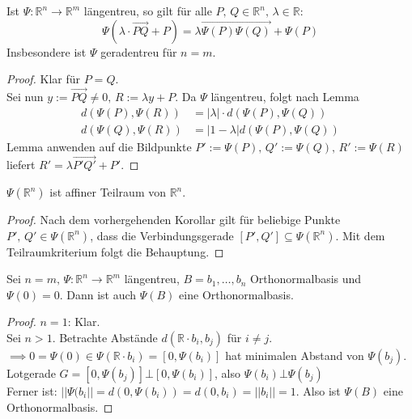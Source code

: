 \documentclass[parskip,a4paper,twoside,DIV15,BCOR12mm]{scrbook}
\begin{document}
\begin{corollary}
Ist \(\Psi:\mathbb{R}^{n}\to\mathbb{R}^{m}\) längentreu, so gilt für alle
\(P,\,Q\in\mathbb{R}^{n},\,\lambda\in\mathbb{R}\):
\[
\Psi(\lambda\cdot\overrightarrow{PQ}+P)=\lambda\overrightarrow{\Psi(P)\Psi(Q)}+\Psi(P)
\]
Insbesondere ist \(\Psi\) geradentreu für \(n=m\).
\end{corollary}
\begin{proof}
Klar für \(P=Q\).\\
Sei nun \(y:=\overrightarrow{PQ}\neq 0,\,R:=\lambda y+P\). Da \(\Psi\) 
längentreu, folgt nach Lemma
\begin{align*}
d(\Psi(P),\Psi(R))&=|\lambda|\cdot d(\Psi(P),\Psi(Q))\\
d(\Psi(Q),\Psi(R))&=|1-\lambda|d(\Psi(P),\Psi(Q))
\end{align*}
Lemma anwenden auf die Bildpunkte \(P':=\Psi(P),\,Q':=\Psi(Q),\,R':=\Psi(R)\)
liefert \(R'=\lambda\overrightarrow{P'Q'}+P'\).
\end{proof}

\begin{corollary}
\(\Psi(\mathbb{R}^{n})\) ist affiner Teilraum von \(\mathbb{R}^{n}\).
\end{corollary}
\begin{proof}
Nach dem vorhergehenden Korollar gilt für beliebige Punkte 
\(P',\,Q'\in\Psi(\mathbb{R}^{n})\), dass die Verbindungsgerade
\([P',Q']\subseteq\Psi(\mathbb{R}^{n})\).
Mit dem Teilraumkriterium folgt die Behauptung.
\end{proof}

\begin{corollary}
Sei \(n=m,\,\Psi:\mathbb{R}^{n}\to\mathbb{R}^{m}\) längentreu, 
\(B={b_{1},\ldots,b_{n}}\) Orthonormalbasis und \(\Psi(0)=0\). Dann ist auch
\(\Psi(B)\) eine Orthonormalbasis.
\end{corollary}
\begin{proof}
\(n=1\): Klar.\\
Sei \(n>1\). Betrachte Abstände \(d(\mathbb{R}\cdot b_{i},{b_{j}})\) für
\(i\neq j\).\\
\(\implies 0=\Psi(0)\in\Psi(\mathbb{R}\cdot b_{i})=[0,\Psi(b_{i})]\) hat 
minimalen Abstand von \(\Psi(b_{j})\).\\
Lotgerade \(G=[0,\Psi(b_{j})]\bot[0,\Psi(b_{i})]\), also \(\Psi(b_{i})\bot\Psi(b_{j})\)\\
Ferner ist: \(||\Psi(b_{i}||=d(0,\Psi(b_{i}))=d(0,b_{i})=||b_{i}||=1\).
Also ist \(\Psi(B)\) eine Orthonormalbasis.
\end{proof}
\end{document}
